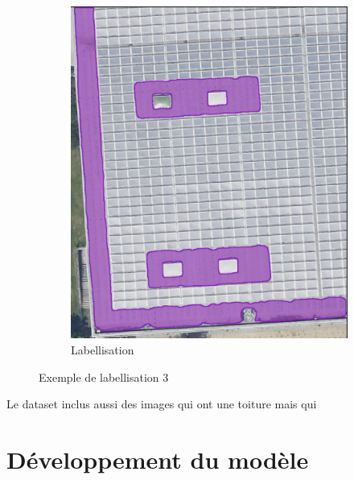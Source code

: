 \begin{figure}[H]
\begin{subfigure}[b]{0.49\textwidth}
        \includegraphics[width=\textwidth]{02-main/figures/ch3/ch3_labellisation_02_exemples_03_solaire2.png}
        \caption{Labellisation}
        \label{fig:ch3_labellisation_02_exemples_03_solaire2}
    \end{subfigure}
    \caption{Exemple de labellisation 3}
    \label{fig:labellisation_solaire_exemple}
\end{figure}

Le dataset inclus aussi des images qui ont une toiture mais qui 
























\section{Développement du modèle}

